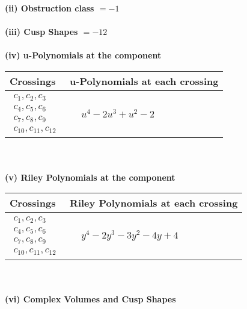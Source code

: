 \documentclass[1p]{elsarticle_modified}
\theoremstyle{definition}
\begin{document}
\flushleft \textbf{(ii) Obstruction class $= -1$}\\~\\
\flushleft \textbf{(iii) Cusp Shapes $= -12$}\\~\\
\newpage\renewcommand{\arraystretch}{1}
\flushleft \textbf{(iv) u-Polynomials at the component}\newline \\
\begin{tabular}{m{50pt}|m{274pt}}
Crossings & \hspace{64pt}u-Polynomials at each crossing \\
\hline $$\begin{aligned}c_{1},c_{2},c_{3}\\c_{4},c_{5},c_{6}\\c_{7},c_{8},c_{9}\\c_{10},c_{11},c_{12}\end{aligned}$$&$\begin{aligned}
&u^4-2 u^3+u^2-2
\end{aligned}$\\
\hline
\end{tabular}\\~\\
\newpage\renewcommand{\arraystretch}{1}
\flushleft \textbf{(v) Riley Polynomials at the component}\newline \\
\begin{tabular}{m{50pt}|m{274pt}}
Crossings & \hspace{64pt}Riley Polynomials at each crossing \\
\hline $$\begin{aligned}c_{1},c_{2},c_{3}\\c_{4},c_{5},c_{6}\\c_{7},c_{8},c_{9}\\c_{10},c_{11},c_{12}\end{aligned}$$&$\begin{aligned}
&y^4-2 y^3-3 y^2-4 y+4
\end{aligned}$\\
\hline
\end{tabular}\\~\\
\newpage\flushleft \textbf{(vi) Complex Volumes and Cusp Shapes}
\end{document}
